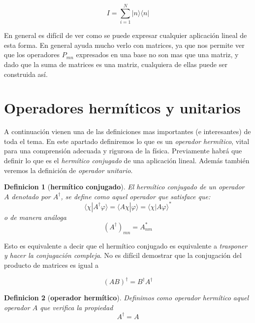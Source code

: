 \documentclass[12pt,a4paper]{book}
\numberwithin{equation}{chapter}
\numberwithin{figure}{chapter}
\newtheorem{definition}{Definicion}[section]
\begin{document}
\begin{equation}
I = \sum_{i=1}^N | n \rangle \langle n |
\end{equation}

En general es difícil de ver como se puede expresar cualquier aplicación lineal de esta forma. En general ayuda mucho verlo con matrices, ya que nos permite ver que los operadores $P_{mn}$ expresados en una base no son mas que una matriz, y dado que la suma de matrices es una matriz, cualquiera de ellas puede ser construida así. \\


\section{Operadores hermíticos y unitarios}

A continuación vienen una de las definiciones mas importantes (e interesantes) de toda el tema. En este apartado definiremos lo que es un \textit{operador hermítico}, vital para una comprensión adecuada y rigurosa de la física. Previamente habrá que definir lo que es el \textit{hermítico conjugado} de una aplicación lineal. Además también veremos la definición de \textit{operador unitario}. \\

\begin{definition}[\textbf{hermítico conjugado}]
El hermítico conjugado de un operador $A$ denotado por $A^\dagger$, se define como aquel operador que satisface que:
\begin{equation}
\langle \chi | A^\dagger \varphi \rangle = \langle A \chi | \varphi \rangle = \langle \chi | A \varphi \rangle^*
\end{equation} 
o de manera análoga
\begin{equation}
(A^\dagger)_{mn} = A_{nm}^*
\end{equation}
\end{definition}

Esto es equivalente a decir que el hermítico conjugado es equivalente a \textit{trasponer y hacer la conjugación compleja}. No es difícil demostrar que la conjugación del producto de matrices es igual a

\begin{equation}
(A B)^\dagger = B^\dagger A^\dagger
\end{equation}

\begin{definition}[\textbf{operador hermítico}] 
Definimos como operador hermítico aquel operador $A$ que verifica la propiedad 
\begin{equation}
A^\dagger = A
\end{equation}
\end{definition}
\end{document}
